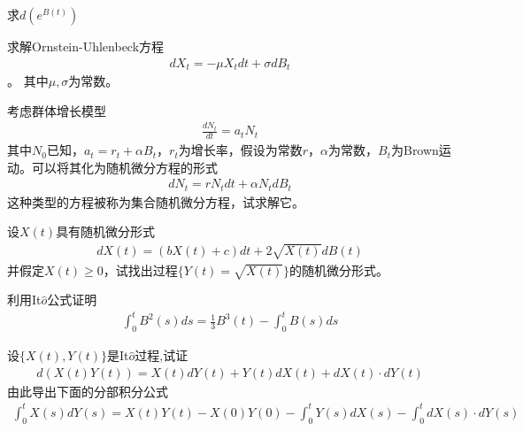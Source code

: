 \begin{Exercises}
	\item 求\(d(e^{B(t)})\)
	\vspace{15em}
	\item 求解Ornstein-Uhlenbeck方程
	\begin{align*}
		dX_t=-\mu X_tdt+\sigma dB_t
	\end{align*}。
	其中\(\mu,\sigma\)为常数。
	\newpage
	\item 考虑群体增长模型
	\begin{align*}
		\frac{dN_t}{dt}=a_tN_t
	\end{align*}
	其中\(N_0\)已知，\(a_t=r_t+\alpha B_t\)，\(r_t\)为增长率，假设为常数\(r\)，\(\alpha\)为常数，\(B_t\)为Brown运动。可以将其化为随机微分方程的形式
	\begin{align*}
		dN_t=rN_tdt+\alpha N_tdB_t
	\end{align*}
	这种类型的方程被称为集合随机微分方程，试求解它。
	\newpage
	\item 设\(X(t)\)具有随机微分形式
	\begin{align*}
		dX(t)=(bX(t)+c)dt+2\sqrt{X(t)}dB(t)
	\end{align*}
	并假定\(X(t)\geqslant0\)，试找出过程\(\{Y(t)=\sqrt{X(t)}\}\)的随机微分形式。
	\newpage
	\item 利用It\(\hat{o}\)公式证明
	\begin{align*}
		\int_{0}^{t}B^2(s)ds=\frac{1}{3}B^3(t)-\int_{0}^{t}B(s)ds
	\end{align*}
	\vspace{15em}
	\item 设\(\{X(t),Y(t)\}\)是It\(\hat{o}\)过程,试证
	\begin{align*}
		d(X(t)Y(t))=X(t)dY(t)+Y(t)dX(t)+dX(t)\cdot dY(t)
	\end{align*}
	由此导出下面的分部积分公式
	\begin{align*}
		\int_{0}^{t}X(s)dY(s)=X(t)Y(t)-X(0)Y(0)-\int_{0}^{t}Y(s)dX(s)-\int_{0}^{t}dX(s)\cdot dY(s)
	\end{align*}
\end{Exercises}